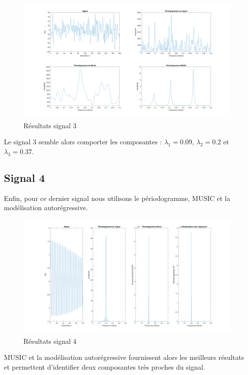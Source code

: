 \documentclass[12pt,a4paper,titlepage]{article}
\begin{document}
\begin{figure}[H]
    \caption{Résultats signal 3}
    \includegraphics[width=\textwidth]{sig3}
    \centering
\end{figure}

Le signal 3 semble alors comporter les composantes : $\lambda_1 = 0.09$, $\lambda_2 = 0.2$ et
$\lambda_3 = 0.37$.

\subsection*{Signal 4}

Enfin, pour ce dernier signal nous utilisons le périodogramme, MUSIC et la modélisation 
autorégressive.

\begin{figure}[H]
    \caption{Résultats signal 4}
    \includegraphics[width=\textwidth]{sig4}
    \centering
\end{figure}

MUSIC et la modélisation autorégressive fournissent alors les meilleurs résultats et permettent
d'identifier deux composantes très proches du signal.
\end{document}
